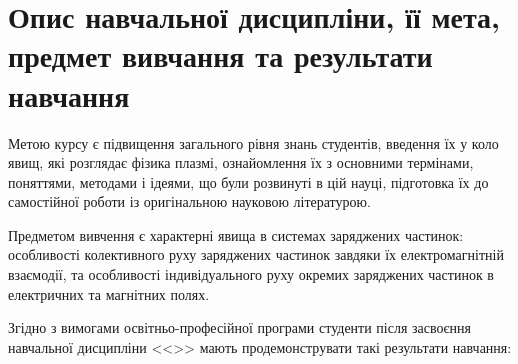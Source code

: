 \documentclass{Syllabus}
\begin{document}
\printhead


\bluetableprint


\section{Опис навчальної дисципліни, її мета, предмет вивчання та результати навчання}


Метою курсу є підвищення загального рівня знань студентів, введення їх у коло явищ, які розглядає фізика плазмі, ознайомлення їх з основними термінами, поняттями, методами і ідеями, що були розвинуті в цій науці, підготовка їх до самостійної роботи із оригінальною науковою літературою.

Предметом вивчення є характерні явища в системах заряджених частинок: особливості колективного руху заряджених частинок завдяки їх електромагнітній взаємодії, та особливості індивідуального руху окремих заряджених частинок в електричних та магнітних полях.


%

Згідно з вимогами освітньо-професійної програми студенти після засвоєння навчальної дисципліни <<\discipline>> мають продемонструвати такі результати навчання:
\end{document}
